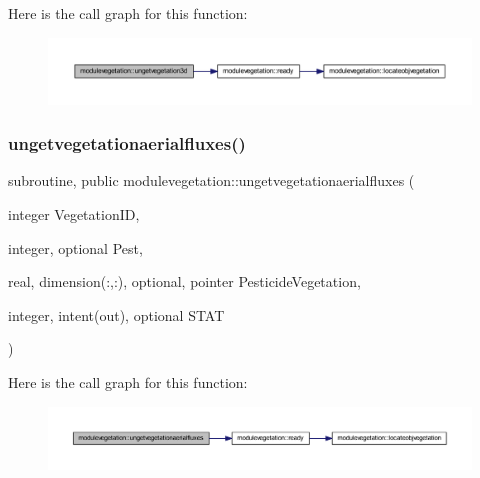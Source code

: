 Here is the call graph for this function\+:\nopagebreak
\begin{figure}[H]
\begin{center}
\leavevmode
\includegraphics[width=350pt]{namespacemodulevegetation_a1908216b2236c50cd95129a3757c0ebd_cgraph}
\end{center}
\end{figure}
\mbox{\label{namespacemodulevegetation_a820fdd3d0dd1463d385d92be5758637b}} 
\subsubsection{\texorpdfstring{ungetvegetationaerialfluxes()}{ungetvegetationaerialfluxes()}}
{\footnotesize\ttfamily subroutine, public modulevegetation\+::ungetvegetationaerialfluxes (\begin{DoxyParamCaption}\item[{integer}]{Vegetation\+ID,  }\item[{integer, optional}]{Pest,  }\item[{real, dimension(\+:,\+:), optional, pointer}]{Pesticide\+Vegetation,  }\item[{integer, intent(out), optional}]{S\+T\+AT }\end{DoxyParamCaption})}

Here is the call graph for this function\+:\nopagebreak
\begin{figure}[H]
\begin{center}
\leavevmode
\includegraphics[width=350pt]{namespacemodulevegetation_a820fdd3d0dd1463d385d92be5758637b_cgraph}
\end{center}
\end{figure}
\mbox{\label{namespacemodulevegetation_a96e88e3033a51f7458b1307ffccc0e3a}} 

